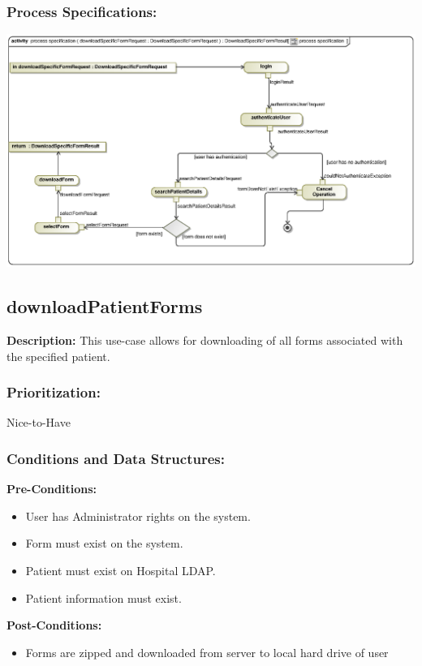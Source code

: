 \subsubsection{Process Specifications:}
\includegraphics[width=1\linewidth]{./Graphics/FormUseCaseDiagrams/processspecification_DownloadSpecificForm}





\subsection{downloadPatientForms} %
\textbf{Description:}
This use-case allows for downloading of all forms associated with the specified patient.
\subsubsection{Prioritization:}
Nice-to-Have
\subsubsection{Conditions and Data Structures:}
\textbf{Pre-Conditions:}
\begin{itemize}
	\item User has Administrator rights on the system.
	\item Form must exist on the system.
	\item Patient must exist on Hospital LDAP.
	\item Patient information must exist.
\end{itemize}

\textbf{Post-Conditions:}	
\begin{itemize}
	\item Forms are zipped and downloaded from server to local hard drive of user
\end{itemize}
